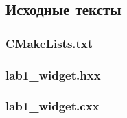 \documentclass[a4paper,12pt,notitlepage,headsepline,pdftex]{scrartcl}
\begin{document}
  \subsection{Исходные тексты}
    \subsubsection{CMakeLists.txt}
      
    \subsubsection{lab1\_widget.hxx}
      
    \subsubsection{lab1\_widget.cxx}
      
\end{document}
